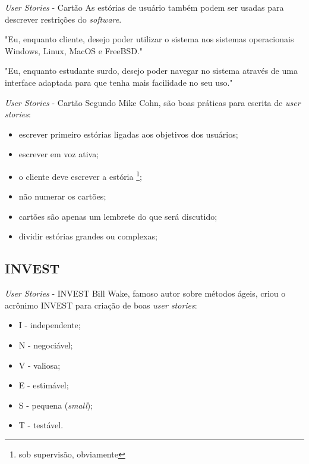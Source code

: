\documentclass[11pt]{beamer}
\begin{document}
    \begin{frame}{\textit{User Stories} - Cartão}
       As estórias de usuário também podem ser usadas para descrever restrições do \textit{software}.
\vspace{1cm}       

       "Eu, enquanto cliente, desejo poder utilizar o sistema nos sistemas operacionais Windows, Linux, MacOS e FreeBSD."
\vspace{1cm}
       
       "Eu, enquanto estudante surdo, desejo poder navegar no sistema através de uma interface adaptada para que tenha mais facilidade no seu uso."
   \end{frame}

   \begin{frame}{\textit{User Stories} - Cartão}
      Segundo Mike Cohn, são boas práticas para escrita de \textit{user stories}:
      \begin{itemize}
         \item escrever primeiro estórias ligadas aos objetivos dos usuários;
         \item escrever em voz ativa;
         \item o cliente deve escrever a estória \footnote{sob supervisão, obviamente};
         \item não numerar os cartões;
         \item cartões são apenas um lembrete do que será discutido;
         \item dividir estórias grandes ou complexas;
      \end{itemize}
   \end{frame}

   \subsection{INVEST}

   \begin{frame}{\textit{User Stories} - INVEST}
      Bill Wake, famoso autor sobre métodos ágeis, criou o acrônimo INVEST para criação de boas \textit{user stories}:
      \begin{itemize}
         \item I - independente;
         \item N - negociável;
         \item V - valiosa;
         \item E - estimável;
         \item S - pequena (\textit{small});
         \item T - testável.
      \end{itemize}
   \end{frame}
\end{document}
